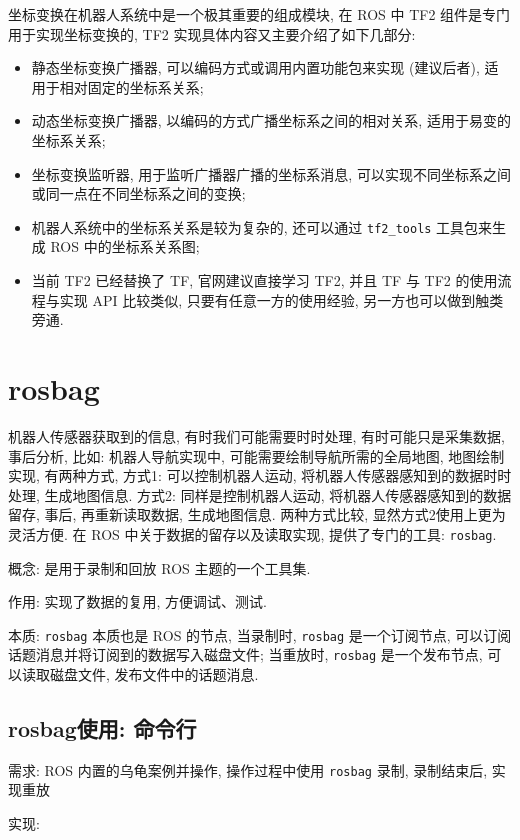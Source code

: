 \documentclass[openany, fontset=windowsold]{ctexbook}
\theoremstyle{kaiti}
\theoremstyle{normal}
\begin{document}
坐标变换在机器人系统中是一个极其重要的组成模块, 在 ROS 中 TF2 组件是专门用于实现坐标变换的, TF2 实现具体内容又主要介绍了如下几部分:

\begin{itemize}
  \item 静态坐标变换广播器, 可以编码方式或调用内置功能包来实现 (建议后者), 适用于相对固定的坐标系关系;
  \item 动态坐标变换广播器, 以编码的方式广播坐标系之间的相对关系, 适用于易变的坐标系关系;
  \item 坐标变换监听器, 用于监听广播器广播的坐标系消息, 可以实现不同坐标系之间或同一点在不同坐标系之间的变换;
  \item 机器人系统中的坐标系关系是较为复杂的, 还可以通过 \verb|tf2_tools| 工具包来生成 ROS 中的坐标系关系图;
  \item 当前 TF2 已经替换了 TF, 官网建议直接学习 TF2, 并且 TF 与 TF2 的使用流程与实现 API 比较类似, 只要有任意一方的使用经验, 另一方也可以做到触类旁通.
\end{itemize}

\section{rosbag}

机器人传感器获取到的信息, 有时我们可能需要时时处理, 有时可能只是采集数据, 事后分析, 比如: 机器人导航实现中, 可能需要绘制导航所需的全局地图, 地图绘制实现, 有两种方式, 方式1: 可以控制机器人运动, 将机器人传感器感知到的数据时时处理, 生成地图信息. 方式2: 同样是控制机器人运动, 将机器人传感器感知到的数据留存, 事后, 再重新读取数据, 生成地图信息. 两种方式比较, 显然方式2使用上更为灵活方便. 在 ROS 中关于数据的留存以及读取实现, 提供了专门的工具: \verb|rosbag|.

概念: 是用于录制和回放 ROS 主题的一个工具集.

作用: 实现了数据的复用, 方便调试、测试.

本质: \verb|rosbag| 本质也是 ROS 的节点, 当录制时, \verb|rosbag| 是一个订阅节点, 可以订阅话题消息并将订阅到的数据写入磁盘文件; 当重放时, \verb|rosbag| 是一个发布节点, 可以读取磁盘文件, 发布文件中的话题消息.

\subsection{rosbag使用: 命令行}

需求: ROS 内置的乌龟案例并操作, 操作过程中使用 \verb|rosbag| 录制, 录制结束后, 实现重放

实现:
\end{document}
